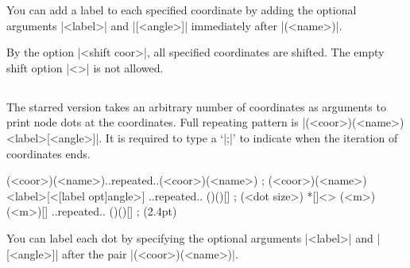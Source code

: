 You can add a label to each specified coordinate by adding the optional arguments |{<label>}| and |[<angle>]| immediately after |(<name>)|.

\begin{tzcode}{.3}
{}
\end{tzcode}

By the option |<shift coor>|, all specified coordinates are shifted.
The empty shift option |<>| is not allowed.

\begin{tzcode}{.3}
{}
\end{tzcode}

\subsection{\protect\cmd{\tzcoors*}}
\label{ss:tzcoors*}

The starred version \icmd{\tzcoors*} takes an arbitrary number of coordinates as arguments to print node dots at the coordinates. Full repeating pattern is |(<coor>)(<name>){<label>}[<angle>]|. It is required to type a  `|;|' to indicate when the iteration of coordinates ends. 

\begin{tzdef}{}
\tzcoors*(<coor>)(<name>)..repeated..(<coor>)(<name>) ;
(<coor>)(<name>){<label>}[<[label opt]angle>] 
                                ..repeated.. ()(){}[] ; (<dot size>)
 *[]<> (<m>)(<m>){}[] ..repeated.. ()(){}[] ; (2.4pt)
\end{tzdef}

You can label each dot by specifying the optional arguments |{<label>}| and |[<angle>]| after the pair |(<coor>)(<name>)|.

\begin{tzcode}{.3}
{}
\end{tzcode}

